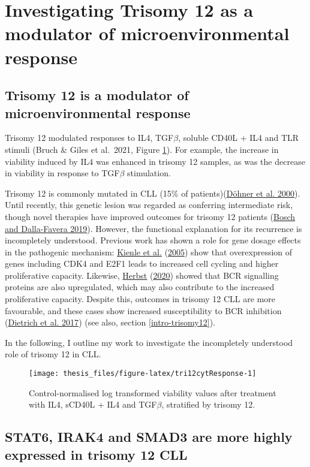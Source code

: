 \documentclass[11pt, a4paper, twosided]{book}
\begin{document}
\hypertarget{investigating-trisomy-12-as-a-modulator-of-microenvironmental-response}{%
\section{Investigating Trisomy 12 as a modulator of microenvironmental response}\label{investigating-trisomy-12-as-a-modulator-of-microenvironmental-response}}

\hypertarget{trisomy12-modulator}{%
\subsection{Trisomy 12 is a modulator of microenvironmental response}\label{trisomy12-modulator}}

Trisomy 12 modulated responses to IL4, TGF\(\beta\), soluble CD40L + IL4 and TLR stimuli (Bruch \& Giles et al.~2021, Figure \ref{fig:tri12cytResponse}). For example, the increase in viability induced by IL4 was enhanced in trisomy 12 samples, as was the decrease in viability in response to TGF\(\beta\) stimulation.

Trisomy 12 is commonly mutated in CLL (15\% of patients)(\protect\hyperlink{ref-Dohner2000}{Döhner et al. 2000}). Until recently, this genetic lesion was regarded as conferring intermediate risk, though novel therapies have improved outcomes for trisomy 12 patients (\protect\hyperlink{ref-Bosch2019}{Bosch and Dalla-Favera 2019}). However, the functional explanation for its recurrence is incompletely understood. Previous work has shown a role for gene dosage effects in the pathogenic mechanism: \protect\hyperlink{ref-Kienle2005}{Kienle et al.} (\protect\hyperlink{ref-Kienle2005}{2005}) show that overexpression of genes including CDK4 and E2F1 leads to increased cell cycling and higher proliferative capacity. Likewise, \protect\hyperlink{ref-HerbstThesis}{Herbst} (\protect\hyperlink{ref-HerbstThesis}{2020}) showed that BCR signalling proteins are also upregulated, which may also contribute to the increased proliferative capacity. Despite this, outcomes in trisomy 12 CLL are more favourable, and these cases show increased susceptibility to BCR inhibition (\protect\hyperlink{ref-JCIpaper}{Dietrich et al. 2017}) (see also, section \ref{intro-trisomy12}).

In the following, I outline my work to investigate the incompletely understood role of trisomy 12 in CLL.


\begin{figure}

{\centering \texttt{[image: thesis\_files/figure-latex/tri12cytResponse-1]} 

}

\caption{Control-normalised log transformed viability values after treatment with IL4, sCD40L + IL4 and TGF\(\beta\), stratified by trisomy 12.}\label{fig:tri12cytResponse}
\end{figure}
\hypertarget{gene-dosage-effects}{%
\subsection{STAT6, IRAK4 and SMAD3 are more highly expressed in trisomy 12 CLL}\label{gene-dosage-effects}}
\end{document}
